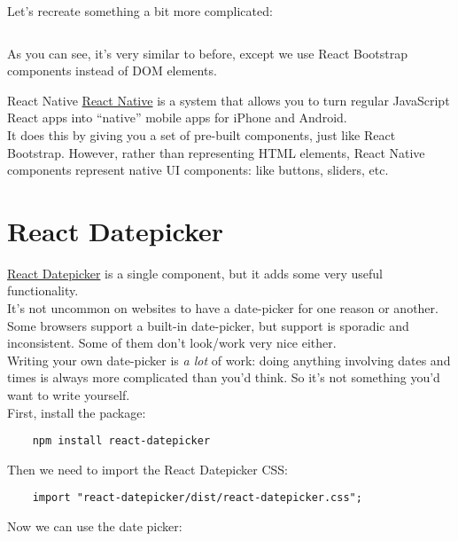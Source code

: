 Let's recreate something a bit more complicated:

\inputminted{js}{07-pre-built-components/figures/01-Figure.js}

As you can see, it's very similar to before, except we use React Bootstrap components instead of DOM elements.


\begin{infobox}{React Native}
    \href{https://facebook.github.io/react-native/}{React Native} is a system that allows you to turn regular JavaScript React apps into ``native'' mobile apps for iPhone and Android.
    \\

    It does this by giving you a set of pre-built components, just like React Bootstrap. However, rather than representing HTML elements, React Native components represent native UI components: like buttons, sliders, etc.
\end{infobox}


\section{React Datepicker}

\href{https://github.com/Hacker0x01/react-datepicker/}{React Datepicker} is a single component, but it adds some very useful functionality.
\\

It's not uncommon on websites to have a date-picker for one reason or another. Some browsers support a built-in date-picker, but support is sporadic and inconsistent. Some of them don't look/work very nice either.
\\

Writing your own date-picker is \textit{a lot} of work: doing anything involving dates and times is always more complicated than you'd think. So it's not something you'd want to write yourself.
\\

First, install the package:

\begin{verbatim}
    npm install react-datepicker
\end{verbatim}

Then we need to import the React Datepicker CSS:

\begin{verbatim}
    import "react-datepicker/dist/react-datepicker.css";
\end{verbatim}

Now we can use the date picker:


